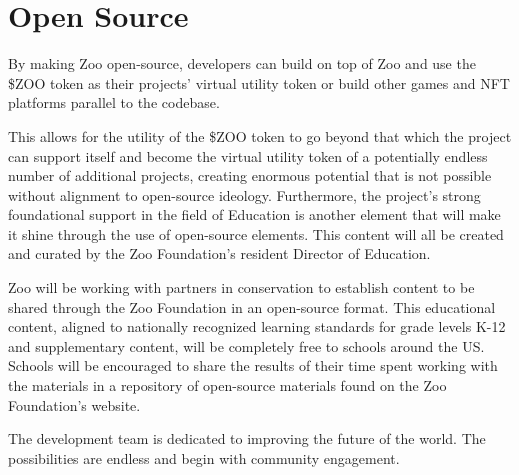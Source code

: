 \section{Open Source}

By making Zoo open-source, developers can build on top of Zoo and use the \$ZOO token as their projects' virtual utility token or build other games and NFT platforms parallel to the codebase.

This allows for the utility of the \$ZOO token to go beyond that which the project can support itself and become the virtual utility token of a potentially endless number of additional projects, creating enormous potential that is not possible without alignment to open-source ideology. Furthermore, the project's strong foundational support in the field of Education is another element that will make it shine through the use of open-source elements. This content will all be created and curated by the Zoo Foundation's resident Director of Education.

Zoo will be working with partners in conservation to establish content to be shared through the Zoo Foundation in an open-source format. This educational content, aligned to nationally recognized learning standards for grade levels K-12 and supplementary content, will be completely free to schools around the US. Schools will be encouraged to share the results of their time spent working with the materials in a repository of open-source materials found on the Zoo Foundation's website.

The development team is dedicated to improving the future of the world. The possibilities are endless and begin with community engagement.
